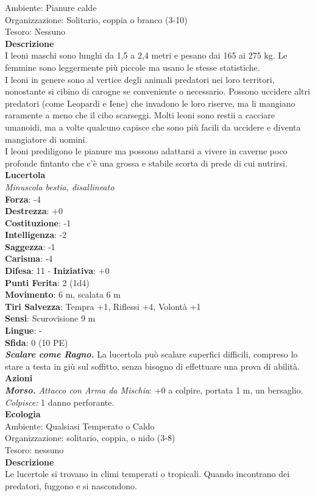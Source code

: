 \begin{multicols}{2}
Ambiente: Pianure calde\\
Organizzazione: Solitario, coppia o branco (3-10)\\
Tesoro: Nessuno\\
\textbf{Descrizione}\\
I leoni maschi sono lunghi da 1,5 a 2,4 metri e pesano dai 165 ai 275 kg. Le femmine sono leggermente più piccole ma usano le stesse statistiche.\\
I leoni in genere sono al vertice degli animali predatori nei loro territori, nonostante si cibino di carogne se conveniente o necessario. Possono uccidere altri predatori (come Leopardi e Iene) che invadono le loro riserve, ma li mangiano raramente a meno che il cibo scarseggi. Molti leoni sono restii a cacciare umanoidi, ma a volte qualcuno capisce che sono più facili da uccidere e diventa mangiatore di uomini.\\
I leoni prediligono le pianure ma possono adattarsi a vivere in caverne poco profonde fintanto che c’è una grossa e stabile scorta di prede di cui nutrirsi. \\

\medskip\textbf{Lucertola}\\
\emph{Minuscola bestia, disallineato}\\
\textbf{Forza}: -4\\
\textbf{Destrezza}: +0\\
\textbf{Costituzione}: -1\\
\textbf{Intelligenza}: -2\\
\textbf{Saggezza}: -1\\
\textbf{Carisma}: -4\\
\textbf{Difesa}: 11 - \textbf{Iniziativa}: +0\\
\textbf{Punti Ferita}: 2 (1d4)\\
\textbf{Movimento}: 6 m, scalata 6 m\\
\textbf{Tiri Salvezza}:  Tempra +1, Riflessi +4, Volontà +1 \\
\textbf{Sensi}: Scurovisione 9 m\\
\textbf{Lingue}: -\\
\textbf{Sfida}: 0 (10 PE)\smallskip\\
\emph{\textbf{Scalare come Ragno.}} La lucertola può scalare superfici difficili, compreso lo stare a testa in giù sul soffitto, senza bisogno di effettuare una prova di abilità.\\
\smallskip\textbf{Azioni}\\
\emph{\textbf{Morso.} Attacco con Arma da Mischia}: +0 a colpire, portata 1 m, un bersaglio.\\
\emph{Colpisce:} 1 danno perforante.\\
\textbf{Ecologia}\\
Ambiente: Qualsiasi Temperato o Caldo\\
Organizzazione: solitario, coppia, o nido (3-8)\\
Tesoro: nessuno\\
\textbf{Descrizione}\\
Le lucertole si trovano in climi temperati o tropicali. Quando incontrano dei predatori, fuggono e si nascondono. \\


\end{multicols}

